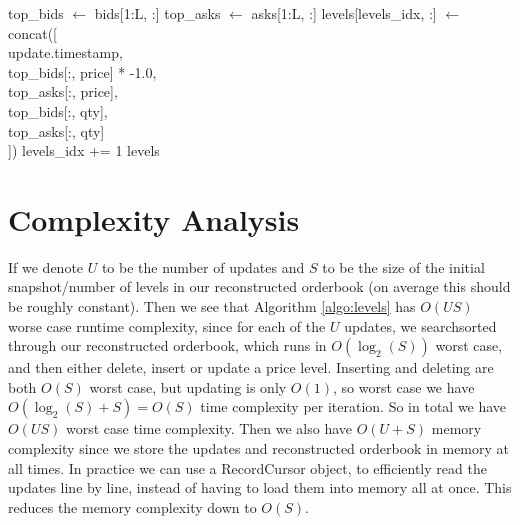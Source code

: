 \documentclass[a4paper, oneside, notitlepage]{book}
\begin{document}
\begin{algorithm*}
\begin{algorithmic}[1]
        
         
            \State top\_bids $\gets$ bids[1:L, :]
            \State top\_asks $\gets$ asks[1:L, :]
            \State levels[levels\_idx, :] $\gets$ concat([ \\
            \hspace{65pt}    update.timestamp, \\
            \hspace{65pt}  top\_bids[:, price] * -1.0, \\
            \hspace{65pt}  top\_asks[:, price],\\
            \hspace{65pt}  top\_bids[:, qty],\\
            \hspace{65pt}  top\_asks[:, qty]\\
            \hspace{47pt}])
            \State levels\_idx += 1
        \EndIf
    \EndFor
    \State \Return levels
\EndFunction
\end{algorithmic}
\label{algo:levels}
\end{algorithm*}

\section{Complexity Analysis}



If we denote $U$ to be the number of updates and $S$ to be the size of the initial snapshot/number of levels
in our reconstructed orderbook (on average this should be roughly constant). Then we see that 
Algorithm \ref{algo:levels} has $O(US)$ worse case runtime complexity, since for each of the $U$ 
updates, we searchsorted through our reconstructed orderbook, which runs in $O(\log_2(S))$ worst case,
and then either delete, insert or update a price level. Inserting and deleting are both $O(S)$ worst case,
but updating is only $O(1)$, so worst case we have $O(\log_2(S) + S) = O(S)$  time complexity per
iteration. So in total we have $O(US)$ worst case time complexity. Then we also have $O(U + S)$ memory
complexity since we store the updates and reconstructed orderbook in memory at all times. 
In practice we can use a RecordCursor object, to efficiently read the updates line by line, instead
of having to load them into memory all at once. This reduces the memory complexity down to $O(S)$.
\end{document}

